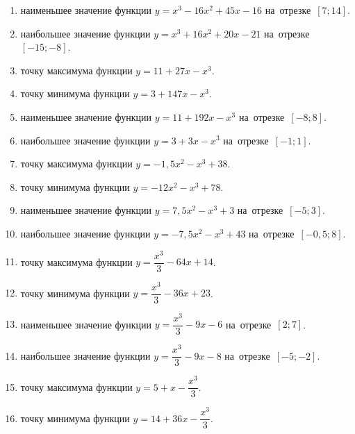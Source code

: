 \documentclass[a4paper,10pt]{article}
\begin{document}
\begin{enumerate}
\item {} наименьшее значение функции $y=x^3 -16x^2+45x-16$ на~отрезке~$\left[7;14\right]$.

\item {} наибольшее значение функции $y=x^3 +16x^2+20x-21$ на~отрезке~$\left[-15;-8\right]$.

\item {} точку максимума функции $y=11+27x-x^3$.

\item {} точку минимума функции $y=3+147x-x^3$.

\item {} наименьшее значение функции $y=11+192x-x^3$ на~отрезке~$\left[-8;8\right]$.

\item {} наибольшее значение функции $y=3+3x-x^3$ на~отрезке~$\left[-1;1\right]$.

\item {} точку максимума функции $y=-1,5x^2-x^3+38$.

\item {} точку минимума функции $y=-12x^2-x^3+78$.

\item {} наименьшее значение функции $y=7,5x^2-x^3+3$ на~отрезке~$\left[-5;3\right]$.

\item {} наибольшее значение функции $y=-7,5x^2-x^3+43$ на~отрезке~$\left[-0,5;8\right]$.

\item {} точку максимума функции $y=\dfrac{x^3}{3} -64x+14$.

\item {} точку минимума функции $y=\dfrac{x^3}{3} -36x+23$.

\item {} наименьшее значение функции $y=\dfrac{x^3}{3} -9x-6$ на~отрезке~$\left[2;7\right]$.

\item {} наибольшее значение функции $y=\dfrac{x^3}{3} -9x-8$ на~отрезке~$\left[-5;-2\right]$.

\item {} точку максимума функции $y=5 +x-\dfrac{x^3}{3}$.

\item {} точку минимума функции $y=14 +36x-\dfrac{x^3}{3}$.


\end{enumerate}
\end{document}

